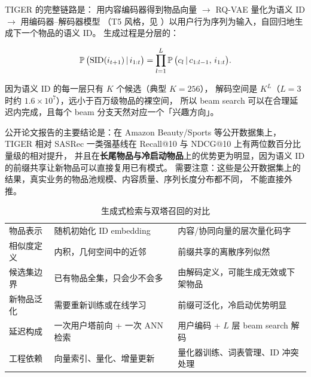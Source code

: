 TIGER \cite{rajput2023tiger} 的完整链路是：
用内容编码器得到物品向量 $\to$ RQ-VAE 量化为语义 ID $\to$ 用编码器--解码器模型
（T5 风格，见 \cite{raffel2020t5}）以用户行为序列为输入，自回归地生成下一个物品的语义 ID。
生成过程是分层的：

\begin{equation}
\operatorname{\mathbb{P}}\big( \text{SID}(i_{t+1}) \,\vert\, i_{1:t} \big)
= \prod_{l=1}^{L} \operatorname{\mathbb{P}}\big( c_l \,\vert\, c_{1:l-1},\, i_{1:t} \big) .
\label{eq:gen-prob}
\end{equation}

因为语义 ID 的每一层只有 $K$ 个候选（典型 $K = 256$），
解码空间是 $K^L$（$L=3$ 时约 $1.6 \times 10^7$），远小于百万级物品的裸空间，
所以 beam search 可以在合理延迟内完成，且每个 beam 分支天然对应一个「兴趣方向」。

公开论文报告的主要结论是：在 Amazon Beauty/Sports 等公开数据集上，
TIGER 相对 SASRec 一类强基线在 Recall@10 与 NDCG@10 上有两位数百分比量级的相对提升，
并且在\textbf{长尾物品与冷启动物品}上的优势更为明显，因为语义 ID 的前缀共享让新物品可以直接复用已有模式。
需要注意：这些是公开数据集上的结果，真实业务的物品池规模、内容质量、序列长度分布都不同，
不能直接外推。

\begin{table}[htbp]
\centering
\caption{生成式检索与双塔召回的对比}
\label{tab:gen-vs-tower}
\small
\begin{tabularx}{\textwidth}{L{2.4cm} L{4.4cm} Y}
\toprule
{} &  &  \\
\midrule
物品表示 & 随机初始化 ID embedding & 内容/协同向量的层次量化码字 \\
\addlinespace
相似度定义 & 内积，几何空间中的近邻 & 前缀共享的离散序列似然 \\
\addlinespace
候选集边界 & 已有物品全集，只会少不会多 & 由解码定义，可能生成无效或下架物品 \\
\addlinespace
新物品泛化 & 需要重新训练或在线学习 & 前缀可泛化，冷启动优势明显 \\
\addlinespace
延迟构成 & 一次用户塔前向 + 一次 ANN 检索 & 用户编码 + $L$ 层 beam search 解码 \\
\addlinespace
工程依赖 & 向量索引、量化、增量更新 & 量化器训练、词表管理、ID 冲突处理 \\
\bottomrule
\end{tabularx}
\end{table}

